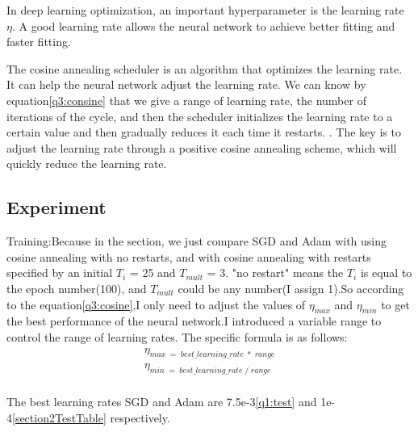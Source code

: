 \documentclass{article}
\begin{document}
In deep learning optimization, an important hyperparameter is the learning rate $\eta$. A good learning rate allows the neural network to achieve better fitting and faster fitting.

The cosine annealing scheduler is an algorithm that optimizes the learning rate. It can help the neural network adjust the learning rate. We can know by equation\ref{q3:consine} that we give a range of learning rate, the number of iterations of the cycle, and then the scheduler initializes the learning rate to a certain value and then gradually reduces it each time it restarts. . The key is to adjust the learning rate through a positive cosine annealing scheme, which will quickly reduce the learning rate.

\subsection{Experiment}

Training:Because in the section, we just compare SGD and Adam with using cosine annealing with no restarts, and with cosine annealing with restarts specified by an initial $T_i$ = 25 and $T_{mult}$ = 3.  "no restart" means the $T_i$ is equal to the epoch number(100), and $T_{mult}$ could be any number(I assign 1).So according to the equation\ref{q3:cosine},I only need to adjust the values of $\eta_{max}$  and $\eta_{min}$ to get the best performance of the neural network.I introduced a variable range to control the range of learning rates. The specific formula is as follows:
\begin{equation}
\begin{array}{l}\eta_{max\;=\;best\_learning\_rate\;\ast\;range}\\\eta_{min\;=\;best\_learning\_rate\;/\;range}\\\end{array}
\end{equation}

The best learning rates SGD and Adam are 7.5e-3\ref{q1:test} and 1e-4\ref{section2TestTable} respectively.
\end{document}
